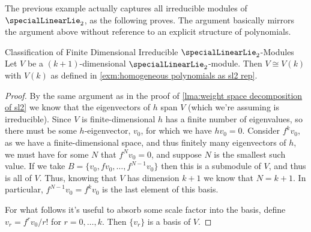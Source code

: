 \documentclass[fleqn]{NotesClass}
\newcommand{\isomorphic}{\cong}
\begin{document}
    The previous example actually captures all irreducible modules of \(\specialLinearLie_2\), as the following proves.
    The argument basically mirrors the argument above without reference to an explicit structure of polynomials.
    
    \begin{prp}{Classification of Finite Dimensional Irreducible \(\specialLinearLie_2\)-Modules}{}
        Let \(V\) be a \((k + 1)\)-dimensional \(\specialLinearLie_2\)-module.
        Then \(V \isomorphic V(k)\) with \(V(k)\) as defined in \cref{exm:homogeneous polynomials as sl2 rep}.
        \begin{proof}
            By the same argument as in the proof of \cref{lma:weight space decomposition of sl2} we know that the eigenvectors of \(h\) span \(V\) (which we're assuming is irreducible).
            Since \(V\) is finite-dimensional \(h\) has a finite number of eigenvalues, so there must be some \(h\)-eigenvector, \(v_0\), for which we have \(h v_0 = 0\).
            Consider \(f^k v_0\), as we have a finite-dimensional space, and thus finitely many eigenvectors of \(h\), we must have for some \(N\) that \(f^N v_0 = 0\), and suppose \(N\) is the smallest such value.
            If we take \(B = \{v_0, fv_0, \dotsc, f^{N-1}v_0\}\) then this is a submodule of \(V\), and thus is all of \(V\).
            Thus, knowing that \(V\) has dimension \(k + 1\) we know that \(N = k + 1\).
            In particular, \(f^{N-1}v_0 = f^kv_0\) is the last element of this basis.
            
            For what follows it's useful to absorb some scale factor into the basis, define \(v_r = f^r v_0 / r!\) for \(r = 0, \dotsc, k\).
            Then \(\{v_r\}\) is a basis of \(V\).
            

\end{proof}
\end{prp}
\end{document}
